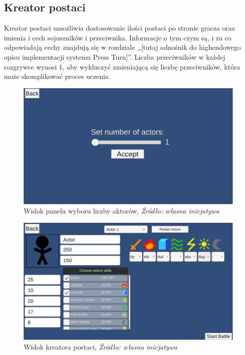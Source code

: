 \documentclass{SGGW-thesis}
\begin{document}
\subsection{Kreator postaci}
Kreator postaci umożliwia dostosowanie ilości postaci po stronie gracza oraz imienia i cech sojuszników i przeciwnika. Informacje o tym czym są, i za co odpowiadają cechy znajdują się w rozdziale ,,[tutaj odnośnik do highendowego opisu implementacji systemu Press Turn]''. Liczba przeciwników w każdej rozgrywce wynosi 1, aby wykluczyć zmieniającą się liczbę przeciwników, która może skomplikować proces uczenia.
\begin{figure}[H]
  \includegraphics[width=1\textwidth]{creatorscreen1.JPG}
  \caption{Widok panelu wyboru liczby aktorów, \textit{Źródło: własna inicjatywa}}
\end{figure}
\begin{figure}[H]
  \includegraphics[width=1\textwidth]{creatorscreen2.JPG}
  \caption{Widok kreatora postaci, \textit{Źródło: własna inicjatywa}}
\end{figure}
\end{document}
